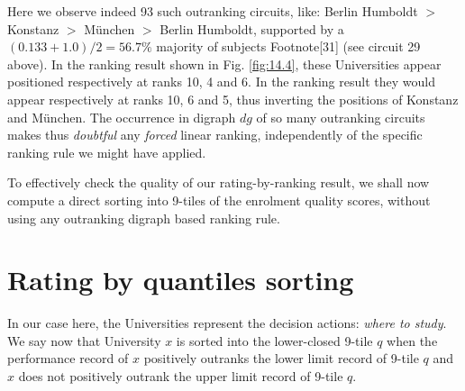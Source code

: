  Here we observe indeed 93 such outranking circuits, like: Berlin Humboldt $>$ Konstanz $>$ München $>$ Berlin Humboldt, supported by a $(0.133 + 1.0)/2 = 56.7\%$ majority of subjects Footnote[31] (see circuit 29 above). In the \Copeland ranking result shown in Fig. \ref{fig:14.4}, these Universities appear positioned respectively at ranks 10, 4 and 6. In the \NetFlows ranking result they would appear respectively at ranks 10, 6 and 5, thus inverting the positions of Konstanz and München. The occurrence in digraph $dg$ of so many outranking circuits makes thus \emph{doubtful} any \emph{forced} linear ranking, independently of the specific ranking rule we might have applied.

To effectively check the quality of our \Copeland rating-by-ranking result, we shall now compute a direct sorting into 9-tiles of the enrolment quality scores, without using any outranking digraph based ranking rule.

\section{Rating by quantiles sorting}
\label{sec:14.3}

In our case here, the Universities represent the decision actions: \emph{where to study}. We say now that University $x$ is sorted into the lower-closed 9-tile $q$ when the performance record of $x$ positively outranks the lower limit record of 9-tile $q$ and $x$ does not positively outrank the upper limit record of 9-tile $q$. 

